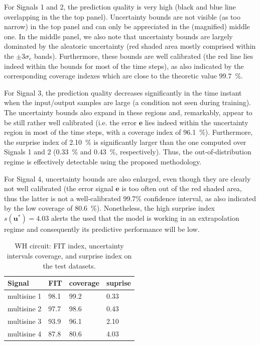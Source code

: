 \documentclass{ifacconf}
\newcommand{\tvec}[1]{{\mathbf{#1}}}
\begin{document}
For Signals 1 and 2, the prediction quality is very high (black and blue line overlapping in the the top panel). Uncertainty bounds are not visible (as too narrow) in the top panel and can only be appreciated in the (magnified) middle one. In the middle panel, we also note that uncertainty bounds are largely dominated by the aleatoric uncertainty (red shaded area mostly comprised within the $\pm 3 \sigma_e$ bands). Furthermore, these bounds are well calibrated (the red line lies indeed  within the bounds for most of the time steps), as also indicated by the corresponding coverage indexes which are close to the theoretic value $99.7$~\%.


For Signal 3, the prediction quality decreases significantly in the time instant when the input/output samples are large (a condition not seen during training). The uncertainty bounds also expand in these regions and, remarkably, appear to be still rather well calibrated (i.e. the error $\tvec{e}$ lies indeed within the uncertainty region in most of the time steps, with a coverage index of 96.1~\%). Furthermore, the surprise index of 2.10~\% is significantly larger than the one computed over Signals 1 and 2 (0.33~\% and 0.43~\%, respectively).
Thus, the out-of-distribution regime is effectively detectable using the proposed methodology.

For Signal 4, uncertainty bounds are also enlarged, even though they are clearly not well calibrated (the error signal $\tvec{e}$ is 
too often out of the red shaded area, thus the latter is not a well-calibrated 99.7\% confidence interval, as also indicated by the low coverage of 80.6~\%). Nonetheless, the high surprise index $s(\tvec{u}^*)=4.03$  alerts the used that the model is working in an extrapolation regime and consequently its predictive performance will be low.


\begin{table}%
    \centering
    \begin{tabular}{|l||l|l|l|}
    \hline
    Signal &  FIT & coverage & suprise \\
    \hline
    multisine 1 &98.1 & 99.2 & 0.33\\
    multisine 2 &97.7 & 98.6 & 0.43\\
    multisine 3 &93.9 & 96.1 & 2.10\\
    multisine 4 &87.8 & 80.6 & 4.03  \\
    \hline
    \end{tabular}
    \caption{WH circuit: FIT index, uncertainty intervals coverage, and surprise index on the test datasets.}
    \label{tab:wh_results}
\end{table}
\end{document}
